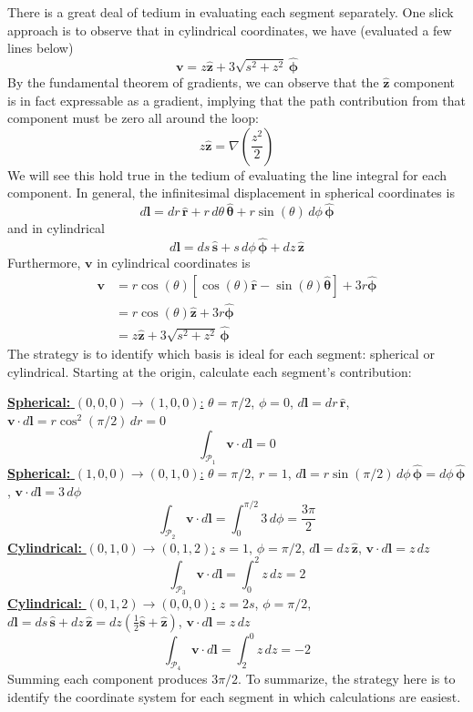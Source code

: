 \documentclass[a4paper]{article}
\begin{document}
There is a great deal of tedium in evaluating each segment separately. One slick approach is to observe that in cylindrical coordinates, we have (evaluated a few lines below)
\[
	\pmb{v} = z \pmb{\hat{z}} + 3 \sqrt{s^{2} + z^{2}} \, \pmb{\hat{\phi}}
\]
By the fundamental theorem of gradients, we can observe that the \( \pmb{\hat{z}} \) component is in fact expressable as a gradient, implying that the path contribution from that component must be zero all around the loop:
\[
	z \pmb{\hat{z}} = \nabla \!\left( \frac{z^{2}}{2} \right) 
\]
We will see this hold true in the tedium of evaluating the line integral for each component. In general, the infinitesimal displacement in spherical coordinates is
\[
	d \pmb{l} = dr \, \pmb{\hat{r}} + r \, d \theta \, \pmb{\hat{\theta}} + r \sin\!\left(\theta\right) \, d \phi \, \pmb{\hat{\phi}}
\]
and in cylindrical
\[
	d \pmb{l} = ds \, \pmb{\hat{s}} + s \, d \phi \, \pmb{\hat{\phi}} + dz \, \pmb{\hat{z}} 
\]
Furthermore, \( \pmb{v} \) in cylindrical coordinates is
\begin{align*}
	\pmb{v} & = r \cos\!\left(\theta\right)\!\left[ \cos\!\left(\theta\right)\pmb{\hat{r}} - \sin\!\left(\theta\right)\pmb{\hat{\theta}} \right] + 3r \pmb{\hat{\phi}} \\
	 & = r \cos\!\left(\theta\right)\pmb{\hat{z}} + 3r \pmb{\hat{\phi}} \\
	 & = z \pmb{\hat{z}} + 3 \sqrt{s^{2} + z^{2}} \, \pmb{\hat{\phi}}
\end{align*}
The strategy is to identify which basis is ideal for each segment: spherical or cylindrical. Starting at the origin, calculate each segment's contribution:

\underline{\textbf{Spherical: }\( \!\left( 0,0,0 \right) \rightarrow \!\left( 1,0,0 \right) \):} \( \theta = \pi / 2 \), \( \phi = 0 \), \( d \pmb{l} = dr \, \pmb{\hat{r}} \), \( \pmb{v} \cdot d \pmb{l} = r \cos^{2}\!\left(\pi / 2\right) \, dr = 0 \)
\[
	\int_{\mathcal{P}_{1}} \pmb{v} \cdot d \pmb{l} = 0 
\]
\underline{\textbf{Spherical: }\( \!\left( 1,0,0 \right) \rightarrow \!\left( 0,1,0 \right) \):} \( \theta = \pi / 2 \), \( r = 1 \), \( d \pmb{l} = r \sin\!\left(\pi / 2\right) \, d \phi \, \pmb{\hat{\phi}} = d \phi \, \pmb{\hat{\phi}}\), \( \pmb{v} \cdot d \pmb{l} = 3 \, d \phi \)
\[
	\int_{\mathcal{P}_{2}} \pmb{v} \cdot d \pmb{l} = \int^{\pi / 2}_{0} 3 \, d \phi = \frac{3 \pi}{2} 
\]
\underline{\textbf{Cylindrical: }\( \!\left( 0,1,0 \right) \rightarrow \!\left( 0,1,2 \right) \):} \( s = 1 \), \( \phi = \pi / 2 \), \( d \pmb{l} = dz \, \pmb{\hat{z}} \), \( \pmb{v} \cdot d \pmb{l} = z \, dz \)
\[
	\int_{\mathcal{P}_{3}}\pmb{v} \cdot d \pmb{l} = \int^{2}_{0} z \, dz = 2
\]
\underline{\textbf{Cylindrical: }\( \!\left( 0,1,2 \right) \rightarrow \!\left( 0,0,0 \right) \):} \( z = 2s \), \( \phi = \pi / 2 \), \( d \pmb{l} = ds \, \pmb{\hat{s}} + dz \, \pmb{\hat{z}} = dz \!\left( \frac{1}{2}\pmb{\hat{s}} + \pmb{\hat{z}} \right) \), \( \pmb{v} \cdot d \pmb{l} = z \, dz \)
\[
	\int_{\mathcal{P}_{4}} \pmb{v} \cdot d \pmb{l} = \int^{0}_{2} z \, dz = -2 
\]
Summing each component produces \( 3 \pi / 2 \). To summarize, the strategy here is to identify the coordinate system for each segment in which calculations are easiest.
\end{document}
